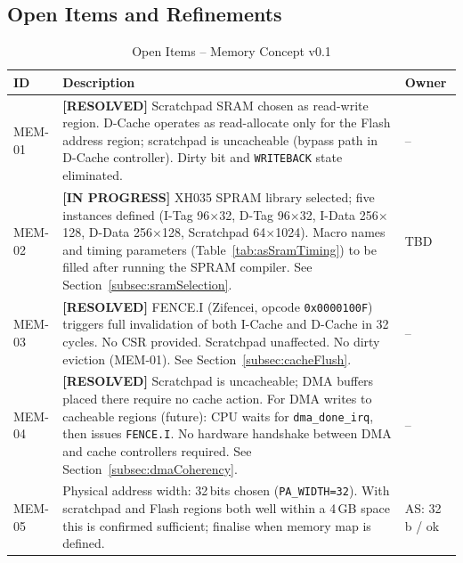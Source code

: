 \subsection{Open Items and Refinements}

\begin{table}[H]
\caption{Open Items -- Memory Concept v0.1}
\label{tab:asMemOpenItems}
\centering
\begin{tabularx}{\textwidth}{|l |X |l|}
  \hline
  ID & Description & Owner \\
  \hline
  \hline
  MEM-01 & \textbf{[RESOLVED]} Scratchpad SRAM chosen as read-write region.
           D-Cache operates as read-allocate only for the Flash address region;
           scratchpad is uncacheable (bypass path in D-Cache controller).
           Dirty bit and \texttt{WRITEBACK} state eliminated. & -- \\
  \hline
  MEM-02 & \textbf{[IN PROGRESS]} XH035 SPRAM library selected; five instances
           defined (I-Tag 96$\times$32, D-Tag 96$\times$32, I-Data 256$\times$128,
           D-Data 256$\times$128, Scratchpad 64$\times$1024).
           Macro names and timing parameters (Table~\ref{tab:asSramTiming})
           to be filled after running the SPRAM compiler.
           See Section~\ref{subsec:sramSelection}. & TBD \\
  \hline
  MEM-03 & \textbf{[RESOLVED]} FENCE.I (Zifencei, opcode \texttt{0x0000100F})
           triggers full invalidation of both I-Cache and D-Cache in 32 cycles.
           No CSR provided. Scratchpad unaffected. No dirty eviction (MEM-01).
           See Section~\ref{subsec:cacheFlush}. & -- \\
  \hline
  MEM-04 & \textbf{[RESOLVED]} Scratchpad is uncacheable; DMA buffers placed
           there require no cache action.
           For DMA writes to cacheable regions (future): CPU waits for
           \texttt{dma\_done\_irq}, then issues \texttt{FENCE.I}.
           No hardware handshake between DMA and cache controllers required.
           See Section~\ref{subsec:dmaCoherency}. & -- \\
  \hline
  MEM-05 & Physical address width: 32\,bits chosen (\texttt{PA\_WIDTH=32}).
           With scratchpad and Flash regions both well within a 4\,GB space
           this is confirmed sufficient; finalise when memory map is defined. & AS: 32\,b / ok \\

\end{tabularx}
\end{table}
